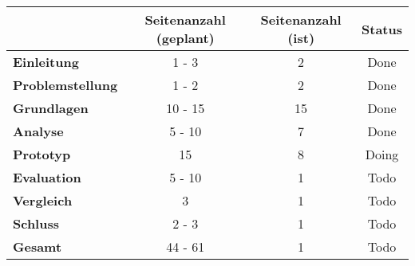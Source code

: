 \begin{table}[H]
\centering
\begin{tabular}{l|c|c|c}
                               & \textbf{Seitenanzahl (geplant)} & \textbf{Seitenanzahl (ist)} & \textbf{Status}        \\ \hline
\textbf{Einleitung}            & 1 - 3                           & {\color{yellow} 2}          & {\color{green} Done}   \\ \hline
\textbf{Problemstellung}       & 1 - 2                           & {\color{green} 2}           & {\color{green} Done}   \\ \hline
\textbf{Grundlagen}            & 10 - 15                         & {\color{green} 15}          & {\color{yellow} Done}  \\ \hline
\textbf{Analyse}               & 5 - 10                          & {\color{green} 7}           & {\color{green} Done}   \\ \hline
\textbf{Prototyp}              & 15                              & {\color{red} 8}             & {\color{yellow} Doing} \\ \hline
\textbf{Evaluation}            & 5 - 10                          & {\color{red} 1}             & {\color{red} Todo}     \\ \hline
\textbf{Vergleich}             & 3                               & {\color{red} 1}             & {\color{red} Todo}     \\ \hline
\textbf{Schluss}               & 2 - 3                           & {\color{red} 1}             & {\color{red} Todo}     \\ \hline
\textbf{Gesamt}                & 44 - 61                         & {\color{red} 1}             & {\color{red} Todo}     \\
\end{tabular}
\end{table}